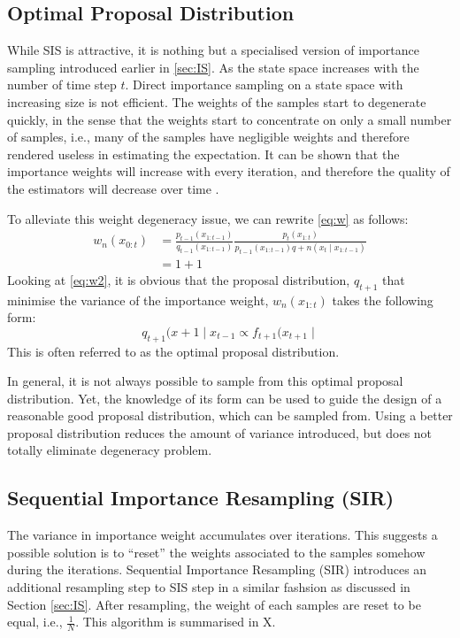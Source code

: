 \subsection{Optimal Proposal Distribution}
While SIS is attractive, it is nothing but a specialised version of importance sampling introduced earlier in \ref{sec:IS}. As the state space increases with the number of time step $t$. Direct importance sampling on a state space with increasing size is not efficient. The weights of the samples start to degenerate quickly, in the sense that the weights start to concentrate on only a small number of samples, i.e., many of the samples have negligible weights and therefore rendered useless in estimating the expectation. It can be shown that the importance weights will increase with every iteration, and therefore the quality of the estimators will decrease over time \cite{}. 

To alleviate this weight degeneracy issue, we can rewrite \eqref{eq:w} as follows:
\begin{align}
 w_n(x_{0:t}) &= \frac{p_{t-1}(x_{1:t-1})}{q_{t-1}(x_{1:t-1})} \frac{p_t(x_{1:t})}{p_{t-1}(x_{1:t-1})q+n(x_t \mid x_{1:t-1})} \nonumber \\
              &= 1+1
\label{eq:w2}
\end{align}
Looking at \eqref{eq:w2}, it is obvious that the proposal distribution, $q_{t+1}$ that minimise the variance of the importance weight, $w_n(x_{1:t})$ takes the following form:
\begin{equation}
 q_{t+1}(x+1 \mid x_{t-1} \propto f_{t+1}(x_{t+1} \mid
\end{equation}
This is often referred to as the optimal proposal distribution.

In general, it is not always possible to sample from this optimal proposal distribution. Yet, the knowledge of its form can be used to guide the design of a reasonable good proposal distribution, which can be sampled from. Using a better proposal distribution reduces the amount of variance introduced, but does not totally eliminate degeneracy problem.

\subsection{Sequential Importance Resampling (SIR)}
The variance in importance weight accumulates over iterations. This suggests a possible solution is to ``reset'' the weights associated to the samples somehow during the iterations. Sequential Importance Resampling (SIR) introduces an additional resampling step to SIS step in a similar fashsion as discussed in Section \ref{sec:IS}. After resampling, the weight of each samples are reset to be equal, i.e., $\frac{1}{N}$. This algorithm is summarised in X.

